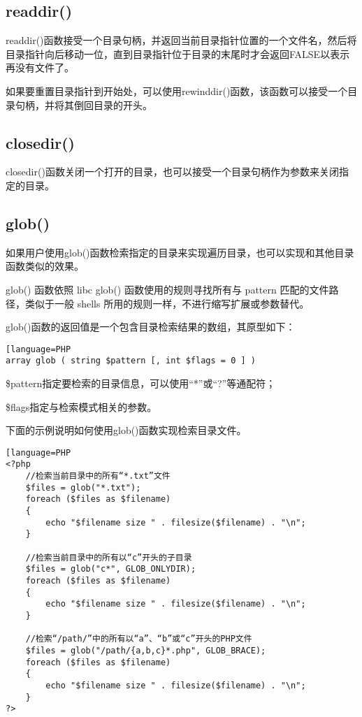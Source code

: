 \subsection{readdir()}

readdir()函数接受一个目录句柄，并返回当前目录指针位置的一个文件名，然后将目录指针向后移动一位，直到目录指针位于目录的末尾时才会返回FALSE以表示再没有文件了。

如果要重置目录指针到开始处，可以使用rewinddir()函数，该函数可以接受一个目录句柄，并将其倒回目录的开头。




\subsection{closedir()}

closedir()函数关闭一个打开的目录，也可以接受一个目录句柄作为参数来关闭指定的目录。




\subsection{glob()}

如果用户使用glob()函数检索指定的目录来实现遍历目录，也可以实现和其他目录函数类似的效果。

glob() 函数依照 libc glob() 函数使用的规则寻找所有与 pattern 匹配的文件路径，类似于一般 shells 所用的规则一样，不进行缩写扩展或参数替代。

glob()函数的返回值是一个包含目录检索结果的数组，其原型如下：

\begin{lstlisting}[language=PHP
array glob ( string $pattern [, int $flags = 0 ] )
\end{lstlisting}


\begin{compactitem}
\item \$pattern指定要检索的目录信息，可以使用“*”或“?”等通配符；
\item \$flags指定与检索模式相关的参数。
\end{compactitem}

下面的示例说明如何使用glob()函数实现检索目录文件。

\begin{lstlisting}[language=PHP
<?php
	//检索当前目录中的所有“*.txt”文件
	$files = glob("*.txt");
	foreach ($files as $filename)
	{
	    echo "$filename size " . filesize($filename) . "\n";
	}

	//检索当前目录中的所有以“c”开头的子目录
	$files = glob("c*", GLOB_ONLYDIR);
	foreach ($files as $filename) 
	{
	    echo "$filename size " . filesize($filename) . "\n";
	}

	//检索“/path/”中的所有以“a”、“b”或“c”开头的PHP文件
	$files = glob("/path/{a,b,c}*.php", GLOB_BRACE);
	foreach ($files as $filename)
	{
	    echo "$filename size " . filesize($filename) . "\n";
	}
?>
\end{lstlisting}




